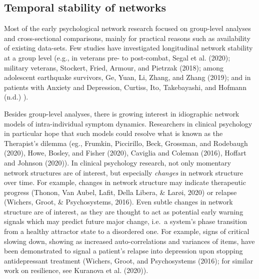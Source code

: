 \documentclass[
  english,
  man]{apa6}
\begin{document}
\hypertarget{temporal-stability-of-networks}{%
\subsection{Temporal stability of networks}\label{temporal-stability-of-networks}}

Most of the early psychological network research focused on group-level analyses and cross-sectional comparisons, mainly for practical reasons such as availability of existing data-sets. Few studies have investigated longitudinal network stability at a group level (e.g., in veterans pre- to post-combat, Segal et al. (2020); military veterans, Stockert, Fried, Armour, and Pietrzak (2018); among adolescent earthquake survivors, Ge, Yuan, Li, Zhang, and Zhang (2019); and in patients with Anxiety and Depression, Curtiss, Ito, Takebayashi, and Hofmann (n.d.) ).

Besides group-level analyses, there is growing interest in idiographic network models of intra-individual symptom dynamics. Researchers in clinical psychology in particular hope that such models could resolve what is known as the Therapist's dilemma (eg., Frumkin, Piccirillo, Beck, Grossman, and Rodebaugh (2020), Howe, Bosley, and Fisher (2020), Caviglia and Coleman (2016), Hoffart and Johnson (2020)). In clinical psychology research, not only momentary network structures are of interest, but especially \emph{changes} in network structure over time. For example, changes in network structure may indicate therapeutic progress (Thonon, Van Aubel, Lafit, Della Libera, \& Larøi, 2020) or relapse (Wichers, Groot, \& Psychosystems, 2016). Even subtle changes in network structure are of interest, as they are thought to act as potential early warning signals which may predict future major change, i.e.~a system's phase transition from a healthy attractor state to a disordered one. For example, signs of critical slowing down, showing as increased auto-correlations and variances of items, have been demonstrated to signal a patient's relapse into depression upon stopping antidepressant treatment (Wichers, Groot, and Psychosystems (2016); for similar work on resilience, see Kuranova et al. (2020)).
\end{document}
